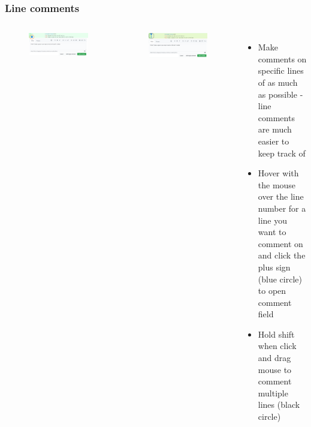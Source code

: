 \documentclass[aspectratio=169]{beamer} %
\begin{document}
\begin{frame}
	\frametitle{Line comments}
	\begin{columns}[c]

		\vspace{-.6cm}
		\begin{figure}
			\centering
			\includegraphics[width=\textwidth]{./img/line-comment-1.png}
		\end{figure}
		\vspace{-.3cm}
		\begin{figure}
			\centering
			\includegraphics[width=\textwidth]{./img/line-comment-2.png}
		\end{figure}

		\begin{itemize}
			\setlength\itemsep{.74em}
			\item Make comments on specific lines of as much as possible
			- line comments are much easier to keep track of
			\item Hover with the mouse over the line number 
			for a line you want to comment on and click the plus sign 
			(blue circle) to open comment field
			\item Hold shift when click and drag mouse to comment multiple lines (black circle)
		\end{itemize}

	\end{columns}
\end{frame}
\end{document}

